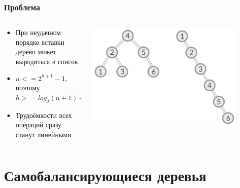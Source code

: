 \documentclass[xetex,mathserif,serif]{beamer}
\begin{document}
	\begin{frame}
		\frametitle{Проблема}
		\begin{columns}
			\begin{column}{0.4\textwidth}
				\begin{itemize}
					\item При неудачном порядке вставки дерево может выродиться в список
					\item $n <= 2^{h + 1} - 1$, поэтому $h >= log_2(n + 1) - 1 >= floor(log_2(n))$
					\item Трудоёмкости всех операций сразу станут линейными
				\end{itemize}
			\end{column}
			\begin{column}{0.6\textwidth}
				\begin{center}
					\includegraphics[width=0.9\textwidth]{badBst.png}
				\end{center}
			\end{column}
		\end{columns}
	\end{frame}

	\section{Самобалансирующиеся деревья}
\end{document}
